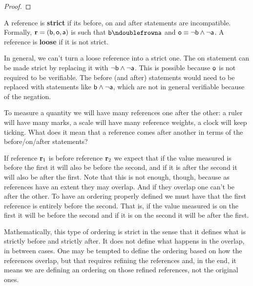 \documentclass[11pt,letterpaper,fleqn]{memoir} %
\begin{document}
\begin{mathSection}
\begin{proof}
\end{proof}
\begin{defn}
	A reference is \textbf{strict} if its before, on and after statements are incompatible. Formally, $\refStmt = (\stmt[b], \stmt[o], \stmt[a])$ is such that $\stmt[b] \ncomp \stmt[a]$ and $\stmt[o] \equiv \NOT \stmt[b] \AND \NOT \stmt[a]$. A reference is \textbf{loose} if it is not strict.
\end{defn}
\begin{remark}
	In general, we can't turn a loose reference into a strict one. The on statement can be made strict by replacing it with $\NOT \stmt[b] \AND \NOT \stmt[a]$. This is possible because $\stmt[o]$ is not required to be verifiable. The before (and after) statements would need to be replaced with statements like $\stmt[b] \AND \NOT \stmt[a]$, which are not in general verifiable because of the negation.
\end{remark}
\end{mathSection}

To measure a quantity we will have many references one after the other: a ruler will have many marks, a scale will have many reference weights, a clock will keep ticking. What does it mean that a reference comes after another in terms of the before/on/after statements?

If reference $\refStmt_1$ is before reference $\refStmt_2$ we expect that if the value measured is before the first it will also be before the second, and if it is after the second it will also be after the first. Note that this is not enough, though, because as references have an extent they may overlap. And if they overlap one can't be after the other. To have an ordering properly defined we must have that the first reference is entirely before the second. That is, if the value measured is on the first it will be before the second and if it is on the second it will be after the first.

Mathematically, this type of ordering is strict in the sense that it defines what is strictly before and strictly after. It does not define what happens in the overlap, in between cases. One may be tempted to define the ordering based on how the references overlap, but that requires refining the references and, in the end, it means we are defining an ordering on those refined references, not the original ones.
\end{document}
